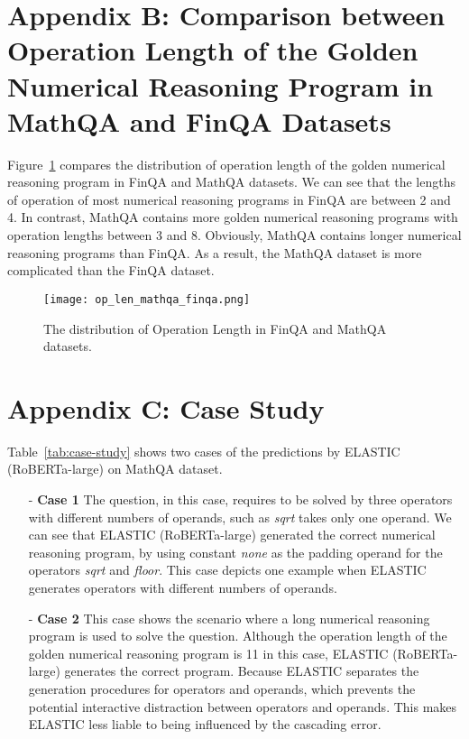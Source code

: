 \documentclass{article}
\begin{document}
\section*{Appendix B: Comparison between Operation Length of the Golden Numerical Reasoning Program in MathQA and FinQA Datasets}
\label{appendix:b}

Figure~\ref{fig:OPLen} compares the distribution of operation length of the golden numerical reasoning program in FinQA and MathQA datasets. We can see that the lengths of operation of most numerical reasoning programs in FinQA are between 2 and 4. In contrast, MathQA contains more golden numerical reasoning programs with operation lengths between 3 and 8. Obviously, MathQA contains longer numerical reasoning programs than FinQA. As a result, the MathQA dataset is more complicated than the FinQA dataset.

\begin{figure}[tbhp!] 
\centering 
\texttt{[image: op\_len\_mathqa\_finqa.png]} 
\caption{The distribution of Operation Length in FinQA and MathQA datasets.} 
\label{fig:OPLen}
\end{figure}


\section*{Appendix C: Case Study}
\label{appendix:c}

















Table~\ref{tab:case-study} shows two cases of the predictions by ELASTIC (RoBERTa-large) on MathQA dataset. 

\begin{itemize}

\item[-] {\bf Case 1} The question, in this case, requires to be solved by three operators with different numbers of operands, such as \textit{sqrt} takes only one operand. We can see that ELASTIC (RoBERTa-large) generated the correct numerical reasoning program, by using constant \textit{none} as the padding operand for the operators \textit{sqrt} and \textit{floor}. This case depicts one example when ELASTIC generates operators with different numbers of operands.

\item[-] {\bf Case 2} This case shows the scenario where a long numerical reasoning program is used to solve the question. Although the operation length of the golden numerical reasoning program is 11 in this case, ELASTIC (RoBERTa-large) generates the correct program. Because ELASTIC separates the generation procedures for operators and operands, which prevents the potential interactive distraction between operators and operands. This makes ELASTIC less liable to being influenced by the cascading error. 

\end{itemize}
\end{document}
